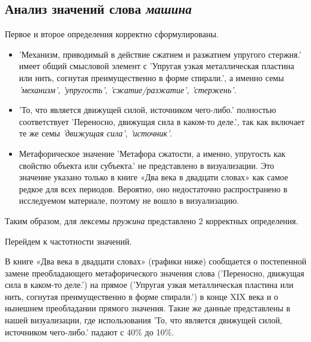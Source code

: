 \subsection*{Анализ значений слова \textit{машина}}

Первое и второе определения корректно сформулированы.

\begin{itemize}
    \item ’Механизм, приводимый в действие сжатием и разжатием упругого стержня.’ имеет общий смысловой элемент с
’Упругая узкая металлическая пластина или нить, согнутая преимущественно в форме спирали.’, а именно семы \textit{’механизм’}, \textit{’упругость’}, \textit{’сжатие/разжатие’}, \textit{’стержень’}.

    \item ’То, что является движущей силой, источником чего-либо.’ полностью соответствует
’Переносно, движущая сила в каком-то деле.’, так как включает те же семы \textit{’движущая сила’}, \textit{’источник’}.
\end{itemize}

\begin{itemize}
    \item Метафорическое значение ’Метафора сжатости, а именно, упругость как свойство объекта или субъекта.’ не представлено в визуализации.
Это значение указано только в книге «Два века в двадцати словах» как самое редкое для всех периодов.
Вероятно, оно недостаточно распространено в исследуемом материале, поэтому не вошло в визуализацию.
\end{itemize}

Таким образом, для лексемы \textit{пружина} представлено 2 корректных определения.

Перейдем к частотности значений.

В книге «Два века в двадцати словах» (графики ниже) сообщается о постепенной замене
преобладающего метафорического значения слова (’Переносно, движущая сила в каком-то деле.’)
на прямое (’Упругая узкая металлическая пластина или нить, согнутая преимущественно в форме спирали.’)
в конце XIX века и о нынешнем преобладании прямого значения.
Такие же данные представлены в нашей визуализации, где использования
’То, что является движущей силой, источником чего-либо.’ падают с 40\% до 10\%.

